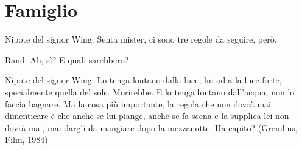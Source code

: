 \section{Famiglio}\label{famiglio}\hypertarget{famiglio}{}

\medskip

\begin{enfasi}{
Nipote del signor Wing: Senta mister, ci sono tre regole da seguire, però.

Rand: Ah, sì? E quali sarebbero?

Nipote del signor Wing: Lo tenga lontano dalla luce, lui odia la luce forte, specialmente quella del sole. Morirebbe. E lo tenga lontano dall'acqua, non lo faccia bagnare. Ma la cosa più importante, la regola che non dovrà mai dimenticare è che anche se lui piange, anche se fa scena e la supplica lei non dovrà mai, mai dargli da mangiare dopo la mezzanotte. Ha capito? (Gremlins, Film, 1984)}
\end{enfasi}

